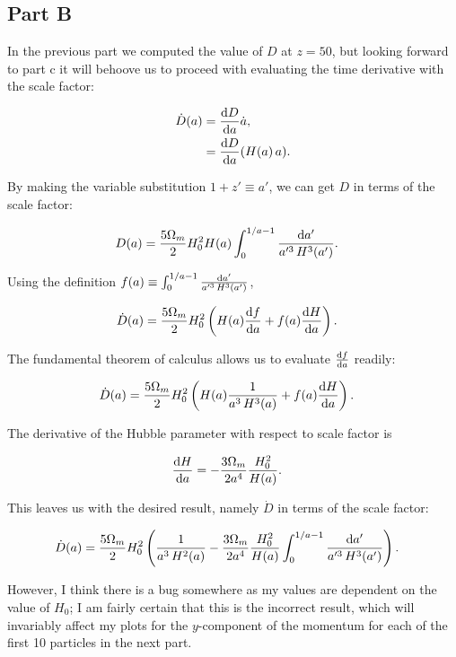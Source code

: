 \subsection{Part B}

In the previous part we computed the value of $D$ at $z=50$, but looking forward to part c it will behoove us to proceed with evaluating the time derivative with the scale factor:

\begin{align}
\dot{D}(a) &= {{\rm d} D \over {\rm d} a} \dot{a}, \\
&= {{\rm d} D \over {\rm d} a} (H(a) \, a).
\end{align}

By making the variable substitution $1+z' \equiv a'$, we can get $D$ in terms of the scale factor:

\begin{align}
D(a) &= {5\Omega_{m} \over 2} H_{0}^{2} H(a) \int_{0}^{1/a - 1} {{\rm d} a' \over a'^{3} \, H^{3}(a')}.
\end{align}

Using the definition $f(a) \equiv \int_{0}^{1/a - 1} {{\rm d} a' \over a'^{3} \, H^{3}(a')}$,

\begin{align}
\dot{D}(a) &= {5\Omega_{m} \over 2} H_{0}^{2}\left( H(a) {{\rm d} f \over {\rm d} a} + f(a) {{\rm d} H \over {\rm d} a}\right).
\end{align}

The fundamental theorem of calculus allows us to evaluate ${{\rm d} f \over {\rm d} a}$ readily:

\begin{align}
\dot{D}(a) &= {5\Omega_{m} \over 2} H_{0}^{2}\left( H(a) {1 \over a^{3} \, H^{3}(a)} + f(a) {{\rm d} H \over {\rm d} a}\right).
\end{align}

The derivative of the Hubble parameter with respect to scale factor is

\begin{align}
{{\rm d}H \over {\rm d}a} &= -{3\Omega_{m} \over 2a^{4}} {H_{0}^{2} \over H(a) }.
\end{align}

This leaves us with the desired result, namely $\dot{D}$ in terms of the scale factor:

\begin{align}
\dot{D}(a) &= {5\Omega_{m} \over 2} H_{0}^{2}\left({1 \over a^{3} \, H^{2}(a)} - {3\Omega_{m} \over 2a^{4}} {H_{0}^{2} \over H(a) } \int_{0}^{1/a - 1} {{\rm d} a' \over a'^{3} \, H^{3}(a')} \right).
\end{align}

However, I think there is a bug somewhere as my values are dependent on the value of $H_{0}$; I am fairly certain that this is the incorrect result, which will invariably affect my plots for the $y$-component of the momentum for each of the first 10 particles in the next part.




